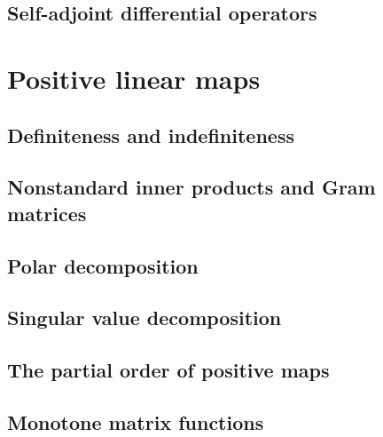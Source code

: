 \documentclass{article}
\begin{document}
\subsection{Self-adjoint differential operators}
\section{Positive linear maps}
\subsection{Definiteness and indefiniteness}
\subsection{Nonstandard inner products and Gram matrices}
\subsection{Polar decomposition}
\subsection{Singular value decomposition}
\subsection{The partial order of positive maps}
\subsection{Monotone matrix functions}
\end{document}
